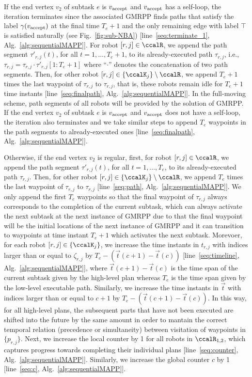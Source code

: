\documentclass[Afour,sageh,times]{sagej}
\newcommand{\vertex}[1]{v_{\textup{#1}}}
\begin{document}
{{{If the  end vertex $v_2$ of subtask $e$ is $\vertex{accept}$ and $\vertex{accept}$ has a self-loop, the iteration terminates since the associated GMRPP finds paths that satisfy the label $\gamma(\vertex{accept})$ at the final time $T_e + 1$ and the only remaining edge with label $\top$ is satisfied naturally (see Fig.~\ref{fig:sub-NBA}) [line~\ref{seq:terminate_1}, Alg.~\ref{alg:sequentialMAPP}]. For robot $[r, j] \in \ccalR$, we append the path segment $\tau'_{r,j}(t)$, for all $t = 1, \ldots, T_e+1$, to its already-executed path $\tau_{r,j}$, i.e.,  $\tau_{r,j} = \tau_{r,j} \cdot \tau'_{r,j}[1:T_e+1]$ where ``$\cdot$'' denotes the concatenation of two path segments. Then, for other robot $[r,j] \in \{\ccalK_j\}\setminus \ccalR$, we  append  $T_e+1$ times  the last waypoint of  $\tau_{r,j}$  to $\tau_{r,j}$, that is, these robots  remain idle for $T_e+1$ time instants [line~\ref{seq:finalpath}, Alg.~\ref{alg:sequentialMAPP}]. In the full-moving scheme, path segments of all robots will be provided by the solution of GMRPP. If the  end vertex $v_2$ of subtask $e$ is $\vertex{accept}$ and $\vertex{accept}$ does not have a self-loop, the iteration also terminates and  we take similar steps to append $T_e$ waypoints in the path segments to already-executed ones [line~\ref{seq:finalpath}, Alg.~\ref{alg:sequentialMAPP}].

Otherwise, if the end vertex $v_2$ is regular, first, for robot $[r, j] \in \ccalR$, we append the path segment $\tau'_{r,j}(t)$, for all $t=1,\ldots, T_e$, to its already-executed path $\tau_{r,j}$. Then, for other robot $[r,j] \in \{\ccalK_j\}\setminus \ccalR$, we  append  $T_e$ times the last waypoint of  $\tau_{r,j}$  to $\tau_{r,j}$ [line~\ref{seq:path}, Alg.~\ref{alg:sequentialMAPP}]. We only append the first $T_e$ waypoints so that the final waypoint of $\tau_{r,j}$ always corresponds to the completion of the current  subtask, which can always activate the next subtask at the next instance of GMRPP due to that the final waypoint will be the initial locations of the next instance of GMRPP and it  can transition to waypoints at time instant $T_e+1$ which activates the next subtask.  Morevoer, for each robot $[r,j] \in \{\ccalK_j\}$, we increase the time instants in $t_{r,j}$ with indices larger than or equal to  $\zeta_{r,j}$ by $T_e - (\vec{t}(c+1) - \vec{t}(c))$ [line~\ref{seq:timeline}, Alg.~\ref{alg:sequentialMAPP}], where $\vec{t}(c+1) - \vec{t}(c)$ is the time span of the current subtask  given by the high-level plan whereas $T_e$ is the time span given by the low-level executable path.
    Similarly, we increase the time instants in $\vec{t}$ with indices larger than or equal to  $c+1$ by $T_e - (\vec{t}(c+1)- \vec{t}(c))$.
    In this way, for all high-level plans, the subsequent parts that have not been executed are shifted into the future by the same amount in order to mantain the correct temporal relation (precedence or simultaneity) between visitation of waypoints in $\{p_{r,j}\}$. Next, we increase  the local counter by 1 for all robots in $\ccalR_{1,2}$, which captures progress towards completing their individual plans [line~\ref{seq:counter}, Alg.~\ref{alg:sequentialMAPP}]. Similarly, we increase the global counter $c$ by 1 [line~\ref{seq:c}, Alg.~\ref{alg:sequentialMAPP}].}

}}
\end{document}
